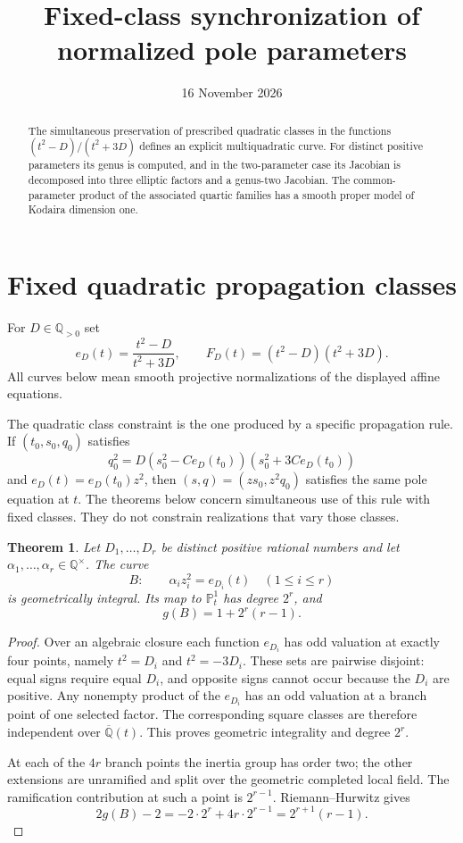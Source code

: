 \documentclass[11pt,a4paper]{article}
\title{Fixed-class synchronization of normalized pole parameters}
\author{}
\date{16 November 2026}
\newtheorem{theorem}{Theorem}[section]
\newcommand{\Q}{\mathbb Q}
\newcommand{\Pp}{\mathbb P}
\begin{document}
\maketitle
\begin{abstract}
The simultaneous preservation of prescribed quadratic classes in the
functions $(t^2-D)/(t^2+3D)$ defines an explicit multiquadratic curve.
For distinct positive parameters its genus is computed, and in the
two-parameter case its Jacobian is decomposed into three elliptic factors
and a genus-two Jacobian. The common-parameter product of the associated
quartic families has a smooth proper model of Kodaira dimension one.
\end{abstract}

\section{Fixed quadratic propagation classes}

For $D\in\Q_{>0}$ set
\[
 e_D(t)=\frac{t^2-D}{t^2+3D},\qquad
 F_D(t)=(t^2-D)(t^2+3D).
\]
All curves below mean smooth projective normalizations of the displayed
affine equations.

The quadratic class constraint is the one produced by a specific
propagation rule. If $(t_0,s_0,q_0)$ satisfies
\[
 q_0^2=D(s_0^2-Ce_D(t_0))(s_0^2+3Ce_D(t_0))
\]
and $e_D(t)=e_D(t_0)z^2$, then $(s,q)=(zs_0,z^2q_0)$ satisfies the
same pole equation at $t$. The theorems below concern simultaneous
use of this rule with fixed classes. They do not constrain realizations
that vary those classes.

\begin{theorem}\label{thm:genus}
Let $D_1,\ldots,D_r$ be distinct positive rational numbers and let
$\alpha_1,\ldots,\alpha_r\in\Q^\times$. The curve
\[
 B:\qquad \alpha_i z_i^2=e_{D_i}(t)\quad(1\leq i\leq r)
\]
is geometrically integral. Its map to $\Pp^1_t$ has degree $2^r$, and
\[
                 g(B)=1+2^r(r-1).
\]
\end{theorem}
\begin{proof}
Over an algebraic closure each function $e_{D_i}$ has odd valuation at
exactly four points, namely $t^2=D_i$ and $t^2=-3D_i$. These sets are
pairwise disjoint: equal signs require equal $D_i$, and opposite signs
cannot occur because the $D_i$ are positive. Any nonempty product of the
$e_{D_i}$ has an odd valuation at a branch point of one selected factor.
The corresponding square classes are therefore independent over
$\overline{\Q}(t)$. This proves geometric integrality and degree $2^r$.

At each of the $4r$ branch points the inertia group has order two; the
other extensions are unramified and split over the geometric completed
local field. The ramification contribution at such a point is
$2^{r-1}$. Riemann--Hurwitz gives
\[
 2g(B)-2=-2\cdot2^r+4r\cdot2^{r-1}=2^{r+1}(r-1).
\]
\end{proof}
\end{document}
